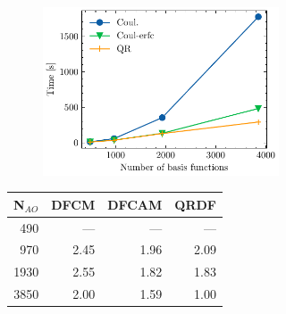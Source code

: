 \begin{figure}[htp]
\begin{subfigure}{\textwidth}
\begin{subfigure}{0.45\textwidth}
\centering
\includegraphics[width=\textwidth]{Pics/mp2_alkan}
\end{subfigure}
\hfill
\begin{subtable}{0.45\textwidth}
\centering
\begin{tabular}{rrrr}
\hline
N$_{AO}$ & DFCM & DFCAM & QRDF \\ \hline
490 & --- & --- 	& --- \\ 
970	& 2.45 & 1.96 & 2.09 \\
1930	 & 2.55 & 1.82 & 1.83 \\
3850	 & 2.00 & 1.59 & 1.00 \\
 \hline
\end{tabular}
\end{subtable}
\caption{}
\label{fig:GS_ZSCALE_LA}
\end{subfigure}

\vspace{1.5\baselineskip}


\end{figure}
